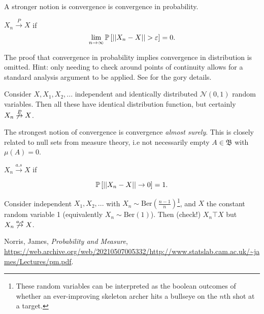 \documentclass[11pt]{scrartcl}
\begin{document}
A stronger notion is convergence is convergence in probability.

\begin{definition}
$X_n \stackrel{P}{\to} X$ if
\begin{equation}
    \lim_{n \to \infty} \P{|| X_n - X || > \eps} = 0.
\end{equation}
\end{definition}

The proof that convergence in probability implies convergence in distribution is omitted. Hint: only needing to check around points of continuity allows for a standard analysis argument to be applied. See \cite{Chuck Norris} for the gory details.

\begin{example}
Consider $X, X_1, X_2, ...$ independent and identically distributed $\mathcal{N}(0,1)$ random variables. Then all these have identical distribution function, but certainly $X_n \not \stackrel{P}{\to} X$. 
\end{example}

The strongest notion of convergence is convergence \textit{almost surely}. This is closely related to null sets from measure theory, i.e not necessarily empty $A \in \mathfrak{B}$ with $\mu (A) = 0$.

\begin{definition}
$X_n \stackrel{a.s}{\to} X$ if  

\begin{equation}
\P{ ||X_n - X|| \to 0} = 1.
\end{equation}
\end{definition}

\begin{example}
Consider independent $X_1, X_2, ... $ with $X_n \sim \text{Ber}(\frac{n-1}{n})$\footnote{These random variables can be interpreted as the boolean outcomes of whether an ever-improving skeleton archer hits a bullseye on the $n$th shot at a target.}, and $X$ the constant random variable 1 (equivalently $X_n \sim \text{Ber}(1)$). Then (check!) $X_n \top X$ but $X_n \not \toas X$.
\end{example}

\begin{thebibliography}{9}
Norris, James, \emph{Probability and Measure}, \url{https://web.archive.org/web/20210507005332/http://www.statslab.cam.ac.uk/~james/Lectures/pm.pdf}.

% 

\end{thebibliography}
\end{document}
